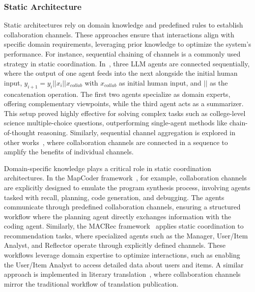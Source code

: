 \documentclass[acmsmall,nonacm]{acmart}
\begin{document}
	\subsubsection{Static Architecture}
            Static architectures rely on domain knowledge and predefined rules to establish collaboration channels. These approaches ensure that interactions align with specific domain requirements, leveraging prior knowledge to optimize the system's performance. For instance, sequential chaining of channels is a commonly used strategy in static coordination. In~\cite{chen-etal-2024-comm}, three LLM agents are connected sequentially, where the output of one agent feeds into the next alongside the initial human input, $y_{i+1}=y_i||x_i||x_{collab}$ with $x_{collab}$ as initial human input, and $||$ as the concatenation operation. The first two agents specialize as domain experts, offering complementary viewpoints, while the third agent acts as a summarizer. This setup proved highly effective for solving complex tasks such as college-level science multiple-choice questions, outperforming single-agent methods like chain-of-thought reasoning. Similarly, sequential channel aggregation is explored in other works~\cite{xiao2024chainofexperts,10.1145/3491102.3517582}, where collaboration channels are connected in a sequence to amplify the benefits of individual channels.

            Domain-specific knowledge plays a critical role in static coordination architectures. In the MapCoder framework~\cite{islam-etal-2024-mapcoder}, for example, collaboration channels are explicitly designed to emulate the program synthesis process, involving agents tasked with recall, planning, code generation, and debugging. The agents communicate through predefined collaboration channels, ensuring a structured workflow where the planning agent directly exchanges information with the coding agent. Similarly, the MACRec framework~\cite{10.1145/3626772.3657669} applies static coordination to recommendation tasks, where specialized agents such as the Manager, User/Item Analyst, and Reflector operate through explicitly defined channels. These workflows leverage domain expertise to optimize interactions, such as enabling the User/Item Analyst to access detailed data about users and items. A similar approach is implemented in literary translation~\cite{wu2024perhapshumantranslationharnessing}, where collaboration channels mirror the traditional workflow of translation publication.
\end{document}
